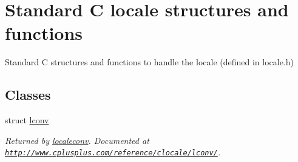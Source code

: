 \hypertarget{group__locale}{\section{Standard C locale structures and functions}
\label{group__locale}
}


Standard C structures and functions to handle the locale (defined in locale.\-h)  


\subsection*{Classes}
\begin{DoxyCompactItemize}
\item 
struct \hyperlink{structlconv}{lconv}
\begin{DoxyCompactList}\small\item\em Returned by \hyperlink{group__locale_ga69b40f71a20a7c8bd67b9eeeae7f40c9}{localeconv}. Documented at \href{http://www.cplusplus.com/reference/clocale/lconv/}{\tt http\-://www.\-cplusplus.\-com/reference/clocale/lconv/}. \end{DoxyCompactList}\end{DoxyCompactItemize}
